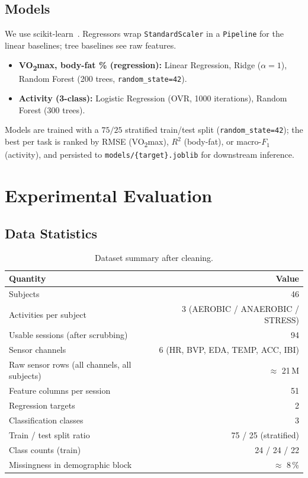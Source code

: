 \documentclass[sigconf,nonacm]{acmart}
\begin{document}
\subsection{Models}
We use scikit-learn~\cite{sklearn}. Regressors wrap
\texttt{StandardScaler} in a \texttt{Pipeline} for the linear
baselines; tree baselines see raw features.

\begin{itemize}
    \item \textbf{VO\textsubscript{2}max, body-fat \% (regression):}
          Linear Regression, Ridge ($\alpha=1$), Random Forest
          (200 trees, \texttt{random\_state=42}).
    \item \textbf{Activity (3-class):} Logistic Regression (OVR, 1000
          iterations), Random Forest (300 trees).
\end{itemize}

Models are trained with a $75/25$ stratified train/test split
(\texttt{random\_state=42}); the best per task is ranked by RMSE
(VO\textsubscript{2}max), $R^{2}$ (body-fat), or macro-$F_{1}$
(activity), and persisted to \texttt{models/\{target\}.joblib} for
downstream inference.

\section{Experimental Evaluation}
\label{sec:eval}

\subsection{Data Statistics}
\label{sec:stats}
\begin{table}[h]
\centering
\caption{Dataset summary after cleaning.}
\begin{tabular}{@{}lr@{}}
\toprule
Quantity & Value \\
\midrule
Subjects & 46 \\
Activities per subject & 3 (AEROBIC / ANAEROBIC / STRESS) \\
Usable sessions (after scrubbing) & 94 \\
Sensor channels & 6 (HR, BVP, EDA, TEMP, ACC, IBI) \\
Raw sensor rows (all channels, all subjects) & $\approx$ 21\,M \\
Feature columns per session & 51 \\
Regression targets & 2 \\
Classification classes & 3 \\
Train / test split ratio & 75 / 25 (stratified) \\
Class counts (train) & 24 / 24 / 22 \\
Missingness in demographic block & $\approx$ 8\,\% \\
\bottomrule
\end{tabular}
\end{table}
\end{document}

